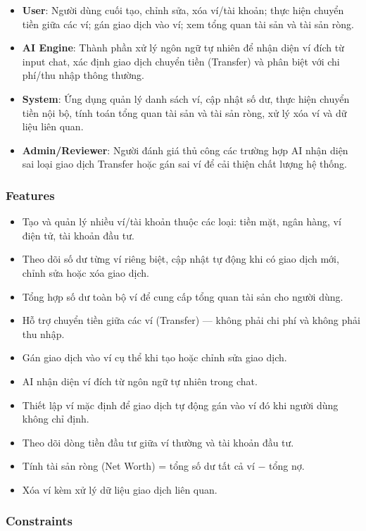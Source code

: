 \begin{itemize}
\item \textbf{User}: Người dùng cuối tạo, chỉnh sửa, xóa ví/tài khoản; thực hiện chuyển tiền giữa các ví; gán giao dịch vào ví; xem tổng quan tài sản và tài sản ròng.
\item \textbf{AI Engine}: Thành phần xử lý ngôn ngữ tự nhiên để nhận diện ví đích từ input chat, xác định giao dịch chuyển tiền (Transfer) và phân biệt với chi phí/thu nhập thông thường.
\item \textbf{System}: Ứng dụng quản lý danh sách ví, cập nhật số dư, thực hiện chuyển tiền nội bộ, tính toán tổng quan tài sản và tài sản ròng, xử lý xóa ví và dữ liệu liên quan.
\item \textbf{Admin/Reviewer}: Người đánh giá thủ công các trường hợp AI nhận diện sai loại giao dịch Transfer hoặc gán sai ví để cải thiện chất lượng hệ thống.
\end{itemize}
\subsubsection{Features}

\begin{itemize}
\item Tạo và quản lý nhiều ví/tài khoản thuộc các loại: tiền mặt, ngân hàng, ví điện tử, tài khoản đầu tư.
\item Theo dõi số dư từng ví riêng biệt, cập nhật tự động khi có giao dịch mới, chỉnh sửa hoặc xóa giao dịch.
\item Tổng hợp số dư toàn bộ ví để cung cấp tổng quan tài sản cho người dùng.
\item Hỗ trợ chuyển tiền giữa các ví (Transfer) — không phải chi phí và không phải thu nhập.
\item Gán giao dịch vào ví cụ thể khi tạo hoặc chỉnh sửa giao dịch.
\item AI nhận diện ví đích từ ngôn ngữ tự nhiên trong chat.
\item Thiết lập ví mặc định để giao dịch tự động gán vào ví đó khi người dùng không chỉ định.
\item Theo dõi dòng tiền đầu tư giữa ví thường và tài khoản đầu tư.
\item Tính tài sản ròng (Net Worth) = tổng số dư tất cả ví − tổng nợ.
\item Xóa ví kèm xử lý dữ liệu giao dịch liên quan.
\end{itemize}
\subsubsection{Constraints}


